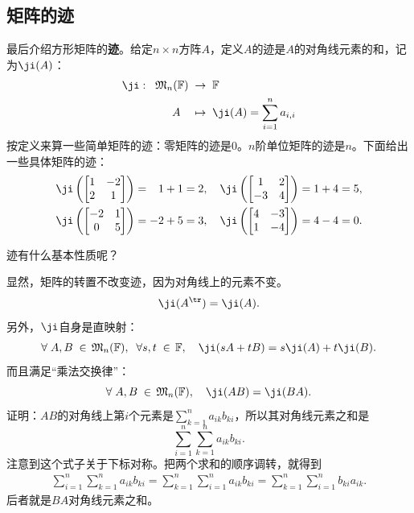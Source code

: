 \documentclass[12pt,UTF8,fontset=none]{ctexbook}
\begin{document}
\subsection{矩阵的迹}
最后介绍方形矩阵的\textbf{迹}。给定$n\times n$方阵$A$，定义$A$的迹是$A$的对角线元素的和，记为$\ji(A)$：
\begin{align*}
    \ji:\;\; \mathfrak{M}_n(\mathbb{F})\; &\rightarrow \; \mathbb{F} \\
    A \quad &\mapsto \; \ji(A) = \sum_{i=1}^n a_{i,i}
\end{align*}
按定义来算一些简单矩阵的迹：零矩阵的迹是$0$。$n$阶单位矩阵的迹是$n$。下面给出一些具体矩阵的迹：
\begin{align*}
    \ji\left(\begin{bmatrix}
        1 & -2 \\ 2 & 1
    \end{bmatrix}\right)
    &= \phantom{-}1 + 1 = 2, \quad 
    \ji\left(\begin{bmatrix}
        1 & 2 \\ -3 & 4
    \end{bmatrix}\right)
    = 1 + 4 = 5, \\
    \ji\left(\begin{bmatrix}
        -2 & 1 \\ 0 & 5
    \end{bmatrix}\right)
    &= -2 + 5 = 3,\quad
    \ji\left(\begin{bmatrix}
        4 & -3 \\ 1 & -4
    \end{bmatrix}\right)
    = 4 - 4 = 0.
\end{align*}

迹有什么基本性质呢？

显然，矩阵的转置不改变迹，因为对角线上的元素不变。
$$ \ji(A^{\tr}) = \ji(A).$$
另外，$\ji$自身是直映射：
\begin{align*}
    \forall \; A, B \; \in \, \mathfrak{M}_n(\mathbb{F}), \;\; \forall s, t \; \in \, \mathbb{F}, \quad \ji(sA + tB) = s\ji(A) + t\ji(B).
\end{align*}
而且满足“乘法交换律”：
$$ \forall \; A, B \; \in \, \mathfrak{M}_n(\mathbb{F}), \quad \ji(AB) = \ji(BA). $$
证明：$AB$的对角线上第$i$个元素是$\sum_{k=1}^n a_{ik} b_{ki}$，所以其对角线元素之和是
$$ \sum_{i=1}^n \sum_{k=1}^n a_{ik} b_{ki}. $$
注意到这个式子关于下标对称。把两个求和的顺序调转，就得到
\begin{align*}
    \sum_{i=1}^n \sum_{k=1}^n a_{ik} b_{ki} = \sum_{k=1}^n \sum_{i=1}^n a_{ik} b_{ki} = \sum_{k=1}^n \sum_{i=1}^n b_{ki} a_{ik}.
\end{align*}
后者就是$BA$对角线元素之和。
\end{document}
